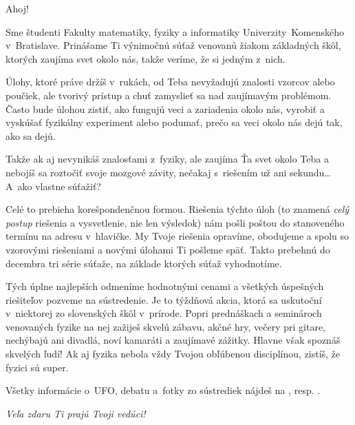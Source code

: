 Ahoj!

Sme študenti Fakulty matematiky, fyziky a informatiky
Univerzity~Komenského v~Bratislave. Prinášame Ti výnimočnú súťaž venovanú
žiakom základných škôl, ktorých zaujíma svet okolo nás, takže veríme,
že si jedným z~nich.

Úlohy, ktoré práve držíš v~rukách, od Teba nevyžadujú znalosti vzorcov
alebo poučiek, ale tvorivý prístup a chuť zamyslieť sa nad zaujímavým
problémom. Často bude úlohou zistiť, ako fungujú veci a zariadenia okolo
nás, vyrobiť a vyskúšať fyzikálny experiment alebo podumať, prečo sa veci
okolo nás dejú tak, ako sa dejú.

Takže ak aj nevynikáš znalosťami z~fyziky, ale zaujíma Ťa svet okolo
Teba a nebojíš sa roztočiť svoje mozgové závity, nečakaj s~riešením už
ani sekundu\dots A~ako vlastne súťažiť?

Celé to prebieha korešpondenčnou formou. Riešenia týchto úloh (to znamená
\emph{celý postup} riešenia a vysvetlenie, nie len výsledok) nám pošli
poštou do stanoveného termínu na adresu v~hlavičke. My Tvoje riešenia
opravíme, obodujeme a spolu so vzorovými riešeniami a novými úlohami Ti
pošleme späť. Takto prebehnú do decembra tri série súťaže, na základe
ktorých súťaž vyhodnotíme.

Tých úplne najlepších odmeníme hodnotnými cenami a všetkých úspešných riešiteľov
pozveme na sústredenie. Je to týždňová akcia, ktorá sa uskutoční v~niektorej zo
slovenských škôl v~prírode. Popri prednáškach a seminároch venovaných fyzike na
nej zažiješ skvelú zábavu, akčné hry, večery pri gitare, nechýbajú ani divadlá,
noví kamaráti a zaujímavé zážitky. Hlavne však spoznáš skvelých ľudí! Ak aj
fyzika nebola vždy Tvojou obľúbenou disciplínou, zistíš, že fyzici sú super.

Všetky informácie o~UFO, debatu a~fotky zo sústrediek nájdeš na \URL{\seminarURL}, resp. .

\hfill \textit{Veľa zdaru Ti prajú Tvoji vedúci!}%
